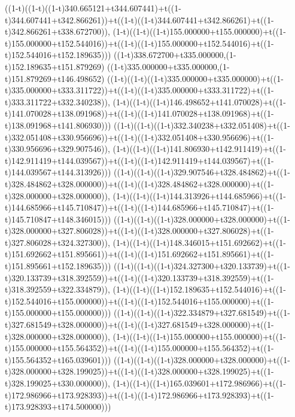 ((1-t)((1-t)((1-t)340.665121+t344.607441)+t((1-t)344.607441+t342.866261))+t((1-t)((1-t)344.607441+t342.866261)+t((1-t)342.866261+t338.672700)),                                     (1-t)((1-t)((1-t)155.000000+t155.000000)+t((1-t)155.000000+t152.544016))+t((1-t)((1-t)155.000000+t152.544016)+t((1-t)152.544016+t152.189635)))
((1-t)338.672700+t335.000000,(1-t)152.189635+t151.879269)
((1-t)335.000000+t335.000000,(1-t)151.879269+t146.498652)
((1-t)((1-t)((1-t)335.000000+t335.000000)+t((1-t)335.000000+t333.311722))+t((1-t)((1-t)335.000000+t333.311722)+t((1-t)333.311722+t332.340238)),                                     (1-t)((1-t)((1-t)146.498652+t141.070028)+t((1-t)141.070028+t138.091968))+t((1-t)((1-t)141.070028+t138.091968)+t((1-t)138.091968+t141.806930)))
((1-t)((1-t)((1-t)332.340238+t332.051408)+t((1-t)332.051408+t330.956696))+t((1-t)((1-t)332.051408+t330.956696)+t((1-t)330.956696+t329.907546)),                                     (1-t)((1-t)((1-t)141.806930+t142.911419)+t((1-t)142.911419+t144.039567))+t((1-t)((1-t)142.911419+t144.039567)+t((1-t)144.039567+t144.313926)))
((1-t)((1-t)((1-t)329.907546+t328.484862)+t((1-t)328.484862+t328.000000))+t((1-t)((1-t)328.484862+t328.000000)+t((1-t)328.000000+t328.000000)),                                     (1-t)((1-t)((1-t)144.313926+t144.685966)+t((1-t)144.685966+t145.710847))+t((1-t)((1-t)144.685966+t145.710847)+t((1-t)145.710847+t148.346015)))
((1-t)((1-t)((1-t)328.000000+t328.000000)+t((1-t)328.000000+t327.806028))+t((1-t)((1-t)328.000000+t327.806028)+t((1-t)327.806028+t324.327300)),                                     (1-t)((1-t)((1-t)148.346015+t151.692662)+t((1-t)151.692662+t151.895661))+t((1-t)((1-t)151.692662+t151.895661)+t((1-t)151.895661+t152.189635)))
((1-t)((1-t)((1-t)324.327300+t320.133739)+t((1-t)320.133739+t318.392559))+t((1-t)((1-t)320.133739+t318.392559)+t((1-t)318.392559+t322.334879)),                                     (1-t)((1-t)((1-t)152.189635+t152.544016)+t((1-t)152.544016+t155.000000))+t((1-t)((1-t)152.544016+t155.000000)+t((1-t)155.000000+t155.000000)))
((1-t)((1-t)((1-t)322.334879+t327.681549)+t((1-t)327.681549+t328.000000))+t((1-t)((1-t)327.681549+t328.000000)+t((1-t)328.000000+t328.000000)),                                     (1-t)((1-t)((1-t)155.000000+t155.000000)+t((1-t)155.000000+t155.564352))+t((1-t)((1-t)155.000000+t155.564352)+t((1-t)155.564352+t165.039601)))
((1-t)((1-t)((1-t)328.000000+t328.000000)+t((1-t)328.000000+t328.199025))+t((1-t)((1-t)328.000000+t328.199025)+t((1-t)328.199025+t330.000000)),                                     (1-t)((1-t)((1-t)165.039601+t172.986966)+t((1-t)172.986966+t173.928393))+t((1-t)((1-t)172.986966+t173.928393)+t((1-t)173.928393+t174.500000)))
